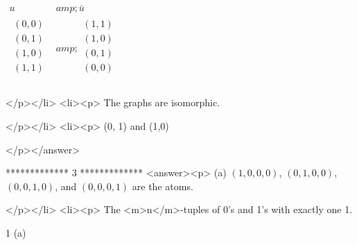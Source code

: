     \(\begin{array}{c|c}
 u &amp; \overset{\pmb{\_}}{u} \\
\hline
 
\begin{array}{c}
 (0,0) \\
 (0,1) \\
 (1,0) \\
 (1,1) \\
\end{array}
 &amp; 
\begin{array}{c}
 (1,1) \\
 (1,0) \\
 (0,1) \\
 (0,0) \\
\end{array}
 \\
\end{array}\)

</p></li>
<li><p>  The graphs are isomorphic.

</p></li>
<li><p>  (0, 1) and (1,0)

</p></answer>


*************
3
*************
<answer><p> (a) \((1, 0, 0, 0)\), \((0, 1, 0, 0)\), \((0, 0, 1, 0)\), and \((0, 0, 0, 1)\) are the atoms. 



   </p></li>
<li><p> The <m>n</m>-tuples of 0{'}s and 1{'}s with exactly one 1.





1 (a)

